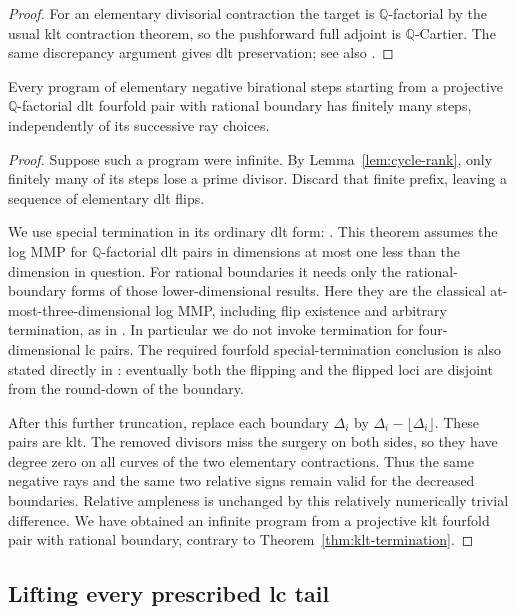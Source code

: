 \begin{proof}
For an elementary divisorial contraction the target is
$\mathbb Q$-factorial by the usual klt contraction theorem, so the
pushforward full adjoint is $\mathbb Q$-Cartier.  The same discrepancy
argument gives dlt preservation; see also
\cite[Remark~3.10.5 and Lemma~3.10.10(1)]{BCHM}.
\end{proof}

\begin{theorem}\label{thm:dlt-termination}
Every program of elementary negative birational steps starting from
a projective $\mathbb Q$-factorial dlt fourfold pair with rational boundary has finitely
many steps, independently of its successive ray choices.
\end{theorem}

\begin{proof}
Suppose such a program were infinite.  By
Lemma~\ref{lem:cycle-rank}, only finitely many of its steps lose a
prime divisor.  Discard that finite prefix, leaving a sequence of
elementary dlt flips.

We use special termination in its ordinary dlt form:
\cite[Theorem~4.2.1 and Remark~4.2.2]{FujinoSpecial}.  This theorem
assumes the log MMP for $\mathbb Q$-factorial dlt pairs in dimensions
at most one less than the dimension in question.  For rational
boundaries it needs only the rational-boundary forms of those
lower-dimensional results.  Here they are the classical
at-most-three-dimensional log MMP, including flip existence and
arbitrary termination, as in \cite{KollarEtAl1992}.  In particular
we do not invoke termination for four-dimensional lc pairs.  The
required fourfold special-termination conclusion is also stated
directly in \cite[Theorem~1.2]{FujinoFourfold}: eventually both the
flipping and the flipped loci are disjoint from the round-down of
the boundary.

After this further truncation, replace each boundary $\Delta_i$ by
$\Delta_i-\lfloor\Delta_i\rfloor$.  These pairs are klt.  The
removed divisors miss the surgery on both sides, so they have degree
zero on all curves of the two elementary contractions.  Thus the
same negative rays and the same two relative signs remain valid
for the decreased boundaries.  Relative ampleness is unchanged
by this relatively numerically trivial difference.  We have
obtained an infinite program from a projective klt fourfold pair with rational
boundary, contrary to Theorem~\ref{thm:klt-termination}.
\end{proof}

\subsection{Lifting every prescribed lc tail}

